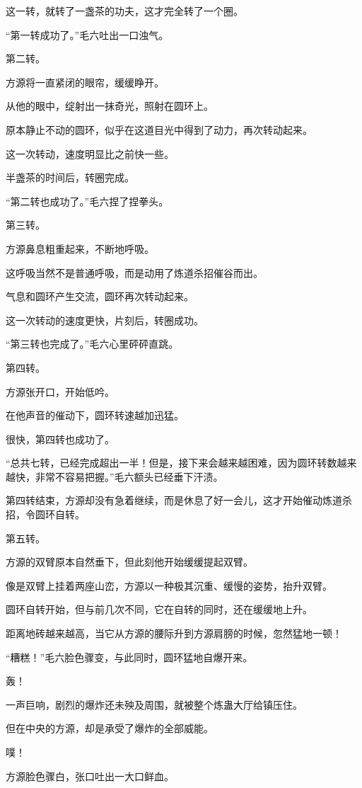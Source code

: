 \begin{this_body}
这一转，就转了一盏茶的功夫，这才完全转了一个圈。

“第一转成功了。”毛六吐出一口浊气。

第二转。

方源将一直紧闭的眼帘，缓缓睁开。

从他的眼中，绽射出一抹奇光，照射在圆环上。

原本静止不动的圆环，似乎在这道目光中得到了动力，再次转动起来。

这一次转动，速度明显比之前快一些。

半盏茶的时间后，转圈完成。

“第二转也成功了。”毛六捏了捏拳头。

第三转。

方源鼻息粗重起来，不断地呼吸。

这呼吸当然不是普通呼吸，而是动用了炼道杀招催谷而出。

气息和圆环产生交流，圆环再次转动起来。

这一次转动的速度更快，片刻后，转圈成功。

“第三转也完成了。”毛六心里砰砰直跳。

第四转。

方源张开口，开始低吟。

在他声音的催动下，圆环转速越加迅猛。

很快，第四转也成功了。

“总共七转，已经完成超出一半！但是，接下来会越来越困难，因为圆环转数越来越快，非常不容易把握。”毛六额头已经垂下汗渍。

第四转结束，方源却没有急着继续，而是休息了好一会儿，这才开始催动炼道杀招，令圆环自转。

第五转。

方源的双臂原本自然垂下，但此刻他开始缓缓提起双臂。

像是双臂上挂着两座山峦，方源以一种极其沉重、缓慢的姿势，抬升双臂。

圆环自转开始，但与前几次不同，它在自转的同时，还在缓缓地上升。

距离地砖越来越高，当它从方源的腰际升到方源肩膀的时候，忽然猛地一顿！

“糟糕！”毛六脸色骤变，与此同时，圆环猛地自爆开来。

轰！

一声巨响，剧烈的爆炸还未殃及周围，就被整个炼蛊大厅给镇压住。

但在中央的方源，却是承受了爆炸的全部威能。

噗！

方源脸色骤白，张口吐出一大口鲜血。


\end{this_body}
